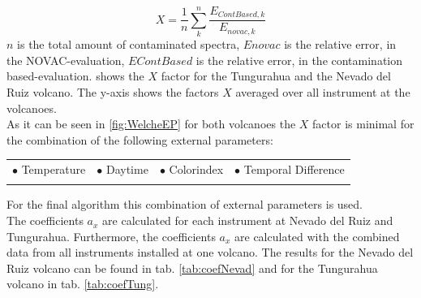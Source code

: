 \documentclass  [
  paper    = a4,
  BCOR     = 10mm,
  twoside,
  fontsize = 12pt,
  fleqn,
  toc      = bibnumbered,
  toc      = listofnumbered,
  numbers  = noendperiod,
  headings = normal,
  listof   = leveldown,
  version  = 3.03
]                                       {scrreprt}
\begin{document}
\begin{equation}
X = \frac{1}{n}\sum_{k}^{n} \frac{E_{ContBased, k}}{E_{novac,k}}
\label{eq:mean}
\end{equation}
$n$ is the total amount of contaminated spectra, $Enovac$ is the relative   error, in the NOVAC-evaluation, $EContBased$ is the relative   error, in the contamination based-evaluation. 
 shows the $X$ factor for the Tungurahua and the Nevado del Ruiz volcano. The y-axis shows the factors $X$ averaged over all instrument at the volcanoes.\\
As it can be seen in \cref{fig:WelcheEP}  for both volcanoes the $X$ factor is minimal for the combination of the following external parameters:\\
%
\begin{table}[h!]
	\begin{tabular}{cccc}
		$\bullet$ Temperature & $\bullet$ Daytime&  $\bullet$ Colorindex & $\bullet$ Temporal Difference\\
		\label{tab:importantexternalParam}
	\end{tabular}
\end{table}
%    
For the final algorithm this combination of external parameters is used.\\    
The coefficients $a_{x}$ are calculated for each instrument at Nevado del Ruiz and Tungurahua. Furthermore, the coefficients $a_{x}$ are calculated with the combined data from all instruments installed at one volcano. The results for the Nevado del Ruiz volcano can be found in tab. \ref{tab:coefNevad} and for the Tungurahua volcano in tab. \ref{tab:coefTung}.\\
\\
%    
\end{document}
